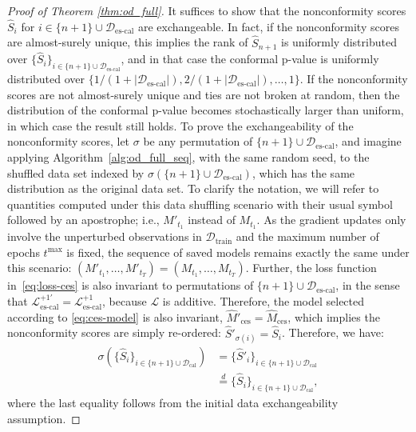 \begin{proof}[Proof of Theorem \ref{thm:od_full}]
It suffices to show that the nonconformity scores $\hat{S}_i$ for $i \in \{n+1\}\cup \mathcal{D}_{\text{es-cal}}$ are exchangeable. In fact, if the nonconformity scores are almost-surely unique, this implies the rank of $\hat{S}_{n+1}$ is uniformly distributed over $\{\hat{S}_{i}\}_{i \in \{n+1\}\cup \mathcal{D}_{\text{es-cal}}}$, and in that case the conformal p-value is uniformly distributed over $\{ 1/(1+|\mathcal{D}_{\text{es-cal}}|), 2/(1+|\mathcal{D}_{\text{es-cal}}|), \dots, 1\}$. If the nonconformity scores are not almost-surely unique and ties are not broken at random, then the distribution of the conformal p-value becomes stochastically larger than uniform, in which case the result still holds.
To prove the exchangeability of the nonconformity scores, let $\sigma$ be any permutation of $\{n+1\}\cup \mathcal{D}_{\text{es-cal}}$, and imagine applying Algorithm~\ref{alg:od_full_seq}, with the same random seed, to the shuffled data set indexed by $\sigma(\{n+1\}\cup \mathcal{D}_{\text{es-cal}})$, which has the same distribution as the original data set. To clarify the notation, we will refer to quantities computed under this data shuffling scenario with their usual symbol followed by an apostrophe; i.e., $M'_{t_1}$ instead of $M_{t_1}$.
As the gradient updates only involve the unperturbed observations in $\mathcal{D}_{\text{train}}$ and the maximum number of epochs $t^{\text{max}}$ is fixed, the sequence of saved models remains exactly the same under this scenario: $(M'_{t_1} , \dots, M'_{t_T}) = (M_{t_1} , \dots, M_{t_T})$.
Further, the loss function in~\eqref{eq:loss-ces} is also invariant to permutations of $\{n+1\}\cup \mathcal{D}_{\text{es-cal}}$, in the sense that $\mathcal{L}_{\text{es-cal}}^{+1'} = \mathcal{L}_{\text{es-cal}}^{+1}$, because $\mathcal{L}$ is additive.
Therefore, the model selected according to \eqref{eq:ces-model} is also invariant, $\hat{M}'_{\text{ces}} = \hat{M}_{\text{ces}}$, which implies the nonconformity scores are simply re-ordered: $\hat{S}'_{\sigma(i)} = \hat{S}_{i}$.
Therefore, we have:
\begin{align*}
  \sigma(\{\hat{S}_i\}_{i \in \{n+1\}\cup \mathcal{D}_{\text{cal}}})
  &= \{\hat{S}'_i\}_{i \in \{n+1\}\cup \mathcal{D}_{\text{cal}}} \\
  & \overset{d}{=} \{\hat{S}_i\}_{i \in \{n+1\}\cup \mathcal{D}_{\text{cal}}},
\end{align*}
where the last equality follows from the initial data exchangeability assumption.
\end{proof}

